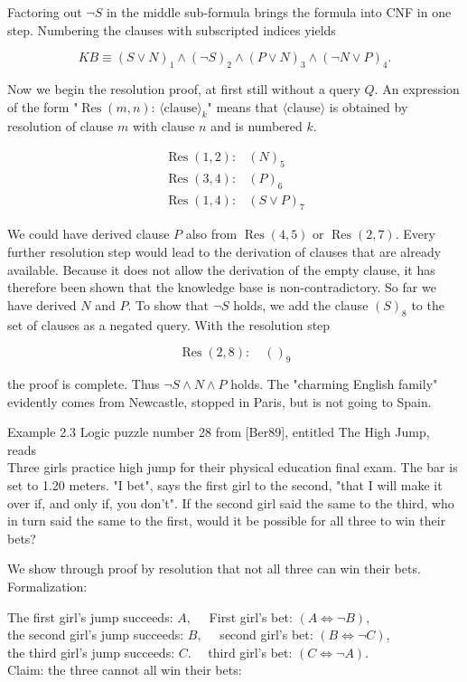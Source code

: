 \documentclass[10pt]{book}
\begin{document}
Factoring out $\neg S$ in the middle sub-formula brings the formula into CNF in one step. Numbering the clauses with subscripted indices yields

$$
K B \equiv(S \vee N)_{1} \wedge(\neg S)_{2} \wedge(P \vee N)_{3} \wedge(\neg N \vee P)_{4} .
$$

Now we begin the resolution proof, at first still without a query $Q$. An expression of the form "$\operatorname{Res}(m, n)$: $\langle\text{clause}\rangle_{k}$" means that $\langle\text{clause}\rangle$ is obtained by resolution of clause $m$ with clause $n$ and is numbered $k$.

$$
\begin{array}{ll}
\operatorname{Res}(1,2): & (N)_{5} \\
\operatorname{Res}(3,4): & (P)_{6} \\
\operatorname{Res}(1,4): & (S \vee P)_{7}
\end{array}
$$

We could have derived clause $P$ also from $\operatorname{Res}(4,5)$ or $\operatorname{Res}(2,7)$. Every further resolution step would lead to the derivation of clauses that are already available. Because it does not allow the derivation of the empty clause, it has therefore been shown that the knowledge base is non-contradictory. So far we have derived $N$ and $P$. To show that $\neg S$ holds, we add the clause $(S)_{8}$ to the set of clauses as a negated query. With the resolution step

$$
\operatorname{Res}(2,8): \quad()_{9}
$$

the proof is complete. Thus $\neg S \wedge N \wedge P$ holds. The "charming English family" evidently comes from Newcastle, stopped in Paris, but is not going to Spain.

Example 2.3 Logic puzzle number 28 from [Ber89], entitled The High Jump, reads\\
Three girls practice high jump for their physical education final exam. The bar is set to 1.20 meters. "I bet", says the first girl to the second, "that I will make it over if, and only if, you don't". If the second girl said the same to the third, who in turn said the same to the first, would it be possible for all three to win their bets?

We show through proof by resolution that not all three can win their bets.\\
Formalization:

The first girl's jump succeeds: $A, \quad$ First girl's bet: $(A \Leftrightarrow \neg B)$,\\
the second girl's jump succeeds: $B, \quad$ second girl's bet: $(B \Leftrightarrow \neg C)$,\\
the third girl's jump succeeds: $C . \quad$ third girl's bet: $(C \Leftrightarrow \neg A)$.\\
Claim: the three cannot all win their bets:
\end{document}
